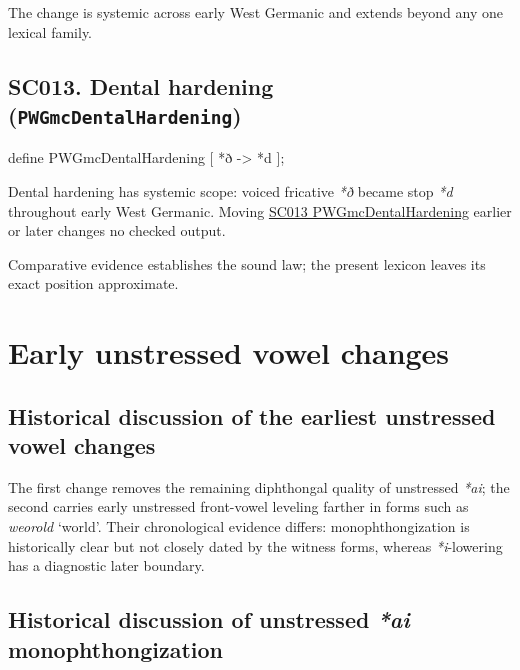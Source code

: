 \documentclass[
  british,
  a4paper,
  openany]{book}
\providecommand{\texorpdfstring}[2]{#1}
\begin{document}
The change is systemic across early West Germanic and extends beyond any
one lexical family.

\subsection{\texorpdfstring{SC013. Dental hardening
(\texttt{PWGmcDentalHardening})}{SC013. Dental hardening (PWGmcDentalHardening)}}\label{rule-PWGmcDentalHardening}

\begin{ReaderFacingFoma}
define PWGmcDentalHardening [
    {*ð} -> {*d}
];
\end{ReaderFacingFoma}

Dental hardening has systemic scope: voiced fricative \emph{*ð} became
stop \emph{*d} throughout early West Germanic. Moving
\hyperref[rule-PWGmcDentalHardening]{SC013 PWGmcDentalHardening} earlier
or later changes no checked output.

Comparative evidence establishes the sound law; the present lexicon
leaves its exact position approximate.

\newpage

\section{Early unstressed vowel
changes}\label{early-unstressed-vowel-changes}

\subsection{Historical discussion of the earliest unstressed vowel
changes}\label{historical-discussion-of-the-earliest-unstressed-vowel-changes}

The first change removes the remaining diphthongal quality of unstressed
\emph{*ai}; the second carries early unstressed front-vowel leveling
farther in forms such as \emph{weorold} `world'. Their chronological
evidence differs: monophthongization is historically clear but not
closely dated by the witness forms, whereas \emph{*i}-lowering has a
diagnostic later boundary.

\subsection{\texorpdfstring{Historical discussion of unstressed
\emph{*ai}
monophthongization}{Historical discussion of unstressed  monophthongization}}\label{historical-discussion-of-unstressed-monophthongization}
\end{document}
